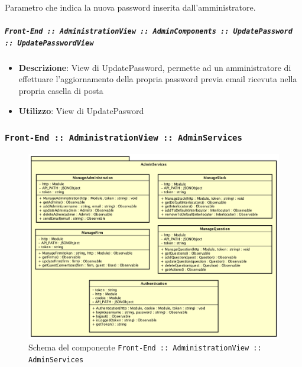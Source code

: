 \documentclass[../DefinizioneDiProdotto.tex]{subfiles}
\begin{document}
\begin{itemize}
\begin{itemize}
\begin{itemize}
\begin{itemize}
	 Parametro che indica la nuova password inserita dall'amministratore.
	\end{itemize}
	\end{itemize}\vspace{0.5em}
	\end{itemize}\subparagraph{\texttt{Front-End :: AdministrationView :: AdminComponents :: UpdatePassword :: UpdatePasswordView}}
	\begin{itemize}\item \textbf{Descrizione}: View di UpdatePassword, permette ad un amministratore di effettuare l'aggiornamento della propria password previa email ricevuta nella propria casella di posta
	\item \textbf{Utilizzo}: View di UpdatePasword
	\end{itemize}\end{itemize}

	\newpage
	\subsubsection{ \texttt{Front-End :: AdministrationView :: AdminServices}}
	\begin{figure}[!h]
		\centering
		\includegraphics[width=\textwidth]{Architettura/Front-End/Administration/AdministrationServices.png}
		\caption{Schema del componente \texttt{Front-End :: AdministrationView :: AdminServices}}
	\end{figure}
\end{document}
